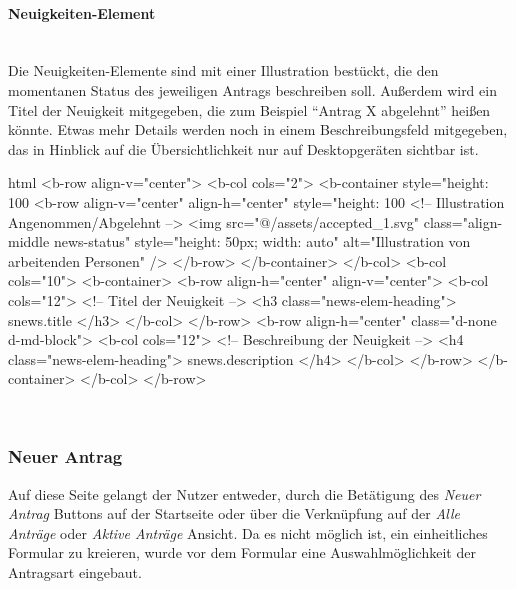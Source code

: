 \paragraph{Neuigkeiten-Element}
~\\
Die Neuigkeiten-Elemente sind mit einer Illustration bestückt, die den momentanen Status des jeweiligen Antrags beschreiben soll. Außerdem wird ein Titel der Neuigkeit mitgegeben, die zum Beispiel \enquote{Antrag X abgelehnt} heißen könnte. Etwas mehr Details werden noch in einem Beschreibungsfeld mitgegeben, das in Hinblick auf die Übersichtlichkeit nur auf Desktopgeräten sichtbar ist.
\begin{code}{html}
	<b-row align-v="center">
	<b-col cols="2">
	  <b-container style="height: 100%
		<b-row align-v="center" align-h="center" style="height: 100%
		  <!-- Illustration Angenommen/Abgelehnt -->
		  <img
			src="@/assets/accepted_1.svg"
			class="align-middle news-status"
			style="height: 50px; width: auto"
			alt="Illustration von arbeitenden Personen"
		  />
		</b-row>
	  </b-container>
	</b-col>
	<b-col cols="10">
	  <b-container>
		<b-row align-h="center" align-v="center">
		  <b-col cols="12">
			<!-- Titel der Neuigkeit -->
			<h3 class="news-elem-heading">{{ snews.title }}</h3>
		  </b-col>
		</b-row>
		<b-row align-h="center" class="d-none d-md-block">
		  <b-col cols="12">
			<!-- Beschreibung der Neuigkeit -->
			<h4 class="news-elem-heading">{{ snews.description }}</h4>
		  </b-col>
		</b-row>
	  </b-container>
	</b-col>
  </b-row>	
\end{code}
	\label{list:htmlnews} ~\\
\newpage
\subsubsection{Neuer Antrag}
\label{chapter:implementierung-frontend-komponenten-neu}
Auf diese Seite gelangt der Nutzer entweder, durch die Betätigung des \textit{Neuer Antrag} Buttons auf der Startseite oder über die Verknüpfung auf der \textit{Alle Anträge} oder \textit{Aktive Anträge} Ansicht. Da es nicht möglich ist, ein einheitliches Formular zu kreieren, wurde vor dem Formular eine Auswahlmöglichkeit der Antragsart eingebaut.
